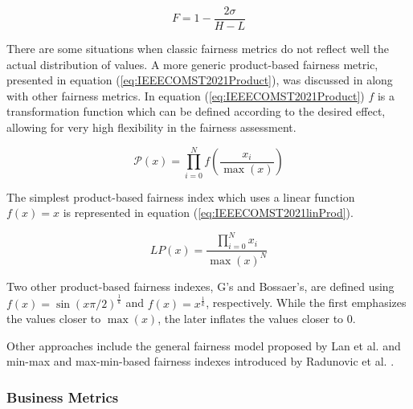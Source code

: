 \begin{equation}
	\label{eq:IEEECOMST2021Hossfeld}
	F=1-\frac{2\sigma}{H-L}
\end{equation}

There are some situations when classic fairness metrics do not reflect well the actual distribution of values. A more generic product-based fairness metric, presented in equation (\ref{eq:IEEECOMST2021Product}), was discussed in \cite{Shi2014} along with other fairness metrics. In equation (\ref{eq:IEEECOMST2021Product}) $f$ is a transformation function which can be defined according to the desired effect, allowing for very high flexibility in the fairness assessment.

\begin{equation}
	\label{eq:IEEECOMST2021Product}
	\mathcal {P}(x)=\prod _{i=0}^{N}f\left({\frac {x_{i}}{\max(x)}}\right)
\end{equation}

The simplest product-based fairness index which uses a linear function $f(x)=x$ is represented in equation (\ref{eq:IEEECOMST2021linProd}).

\begin{equation}
	\label{eq:IEEECOMST2021linProd}
	LP(x)=\frac{\prod _{i=0}^{N}x_{i}}{\max(x)^{N}}
\end{equation}

Two other product-based fairness indexes, G's and Bossaer's, are defined using $f(x)=\sin(x\pi /2)^{\frac {1}{k}}$ and $f(x)=x^{\frac {1}{k}}$, respectively. While the first emphasizes the values closer to $\max(x)$, the later inflates the values closer to 0.

Other approaches include the general fairness model proposed by Lan et al. \cite{Lan2010} and min-max and max-min-based fairness indexes introduced by Radunovic et al. \cite{Radunovic2007}.

\subsubsection{Business Metrics}
\label{sec:IEEECOMSTbusiness}

